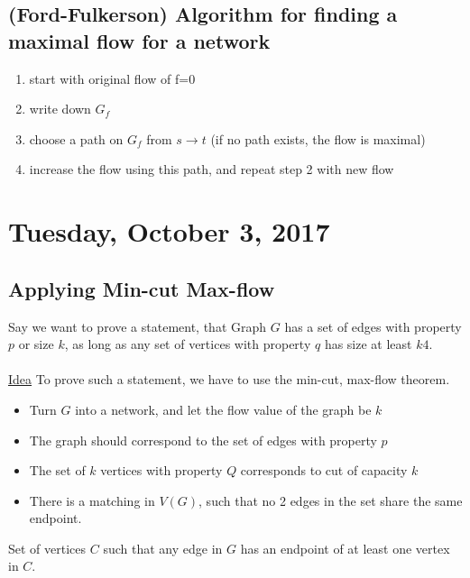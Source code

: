\documentclass[12pt]{article}
\begin{document}
\subsection{(Ford-Fulkerson) Algorithm for finding a maximal flow for a network}

\begin{enumerate}
	\item{start with original flow of f=0}
	\item{write down $G_f$}
	\item{choose a path on $G_f$ from $s\rightarrow t$ (if no path exists, the flow is maximal)}
	\item{increase the flow using this path, and repeat step 2 with new flow}
\end{enumerate}

\newpage

\section{Tuesday, October 3, 2017}

\subsection{Applying Min-cut Max-flow}

Say we want to prove a statement, that Graph $G$ has a set of edges with property $p$ or size $k$, as long as any set of vertices with property $q$ has size at least $k4$.\\
\\
\underline{Idea} To prove such a statement, we have to use the min-cut, max-flow theorem.
\begin{itemize}
	\item{Turn $G$ into a network, and let the flow value of the graph be $k$}
	\item{The graph should correspond to the set of edges with property $p$}
	\item{The set of $k$ vertices with property $Q$ corresponds to cut of capacity $k$}
	\item{There is a matching in $V(G)$, such that no 2 edges in the set share the same endpoint.}
\end{itemize}

\begin{tcolorbox}[title=Definition: Vertex Cover]
	Set of vertices $C$ such that any edge in $G$ has an endpoint of at least one vertex in $C$.
\end{tcolorbox}
\end{document}
